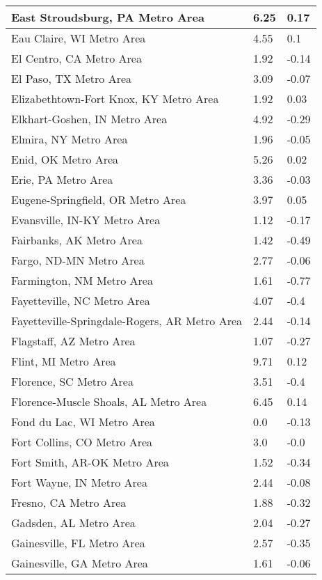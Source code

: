 \documentclass[12pt,oneside, letterpaper]{book}
\begin{document}
\begin{longtable}{| p{} | p{} | p{} |}
    East Stroudsburg, PA Metro Area & 6.25 & 0.17 \\ \hline
    Eau Claire, WI Metro Area & 4.55 & 0.1 \\ \hline
    El Centro, CA Metro Area & 1.92 & -0.14 \\ \hline
    El Paso, TX Metro Area & 3.09 & -0.07 \\ \hline
    Elizabethtown-Fort Knox, KY Metro Area & 1.92 & 0.03 \\ \hline
    Elkhart-Goshen, IN Metro Area & 4.92 & -0.29 \\ \hline
    Elmira, NY Metro Area & 1.96 & -0.05 \\ \hline
    Enid, OK Metro Area & 5.26 & 0.02 \\ \hline
    Erie, PA Metro Area & 3.36 & -0.03 \\ \hline
    Eugene-Springfield, OR Metro Area & 3.97 & 0.05 \\ \hline
    Evansville, IN-KY Metro Area & 1.12 & -0.17 \\ \hline
    Fairbanks, AK Metro Area & 1.42 & -0.49 \\ \hline
    Fargo, ND-MN Metro Area & 2.77 & -0.06 \\ \hline
    Farmington, NM Metro Area & 1.61 & -0.77 \\ \hline
    Fayetteville, NC Metro Area & 4.07 & -0.4 \\ \hline
    Fayetteville-Springdale-Rogers, AR Metro Area & 2.44 & -0.14 \\ \hline
    Flagstaff, AZ Metro Area & 1.07 & -0.27 \\ \hline
    Flint, MI Metro Area & 9.71 & 0.12 \\ \hline
    Florence, SC Metro Area & 3.51 & -0.4 \\ \hline
    Florence-Muscle Shoals, AL Metro Area & 6.45 & 0.14 \\ \hline
    Fond du Lac, WI Metro Area & 0.0 & -0.13 \\ \hline
    Fort Collins, CO Metro Area & 3.0 & -0.0 \\ \hline
    Fort Smith, AR-OK Metro Area & 1.52 & -0.34 \\ \hline
    Fort Wayne, IN Metro Area & 2.44 & -0.08 \\ \hline
    Fresno, CA Metro Area & 1.88 & -0.32 \\ \hline
    Gadsden, AL Metro Area & 2.04 & -0.27 \\ \hline
    Gainesville, FL Metro Area & 2.57 & -0.35 \\ \hline
    Gainesville, GA Metro Area & 1.61 & -0.06 \\ \hline

\end{longtable}
\end{document}
